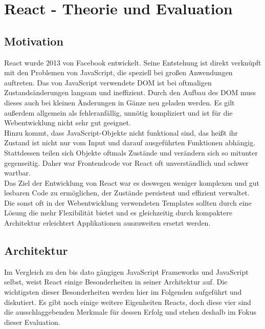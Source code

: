 
\chapter{React - Theorie und Evaluation}
  \label{Evalution React}

\section{Motivation}
React wurde 2013 von Facebook entwickelt. Seine Entstehung ist direkt verknüpft mit den Problemen von JavaScript, die speziell bei großen Anwendungen auftreten. Das von JavaScript verwendete DOM ist bei oftmaligen Zustandsänderungen langsam und ineffizient. Durch den Aufbau des DOM muss dieses auch bei kleinen Änderungen in Gänze neu geladen werden. Es gilt außerdem allgemein als fehleranfällig, unnötig kompliziert und ist für die Webentwicklung nicht sehr gut geeignet. \\
Hinzu kommt, dass JavaScript-Objekte nicht funktional sind, das heißt ihr Zustand ist nicht nur vom Input und darauf ausgeführten Funktionen abhängig. Stattdessen teilen sich Objekte oftmals Zustände und verändern sich so mitunter gegenseitig. Daher war Frontendcode vor React oft unverständlich und schwer wartbar. \\
Das Ziel der Entwicklung von React war es deswegen weniger komplexen und gut lesbaren Code zu ermöglichen, der Zustände persistent und effizient verwaltet. Die sonst oft in der Webentwicklung verwendeten Templates sollten durch eine Lösung die mehr Flexibilität bietet und es gleichzeitig durch kompaktere Architektur erleichtert Applikationen auszuweiten ersetzt werden.
\section{Architektur}
Im Vergleich zu den bis dato gängigen JavaScript Frameworks und JavaScript selbst, weist React einige Besonderheiten in seiner Architektur auf. Die wichtigsten dieser Besonderheiten werden hier im Folgenden aufgeführt und diskutiert. Es gibt noch einige weitere Eigenheiten Reacts, doch diese vier sind die ausschlaggebenden Merkmale für dessen Erfolg und stehen deshalb im Fokus dieser Evaluation.
